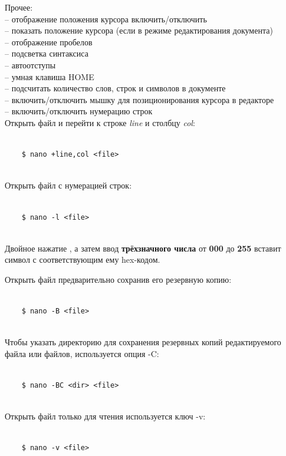 \noindent
{\large{Прочее:}}\\
 -- отображение положения курсора включить/отключить\\
 -- показать положение курсора (если в режиме редактирования документа)\\
 -- отображение пробелов\\
 -- подсветка синтаксиса\\
 -- автоотступы\\
 -- умная клавиша HOME\\
 -- подсчитать количество слов, строк и символов в документе\\
 -- включить/отключить мышку для позиционирования курсора в редакторе\\
 -- включить/отключить нумерацию строк\\

Открыть файл  и перейти к строке \textit{line} и столбцу \textit{col}:
\begin{lstlisting}
	
	$ nano +line,col <file>
	
\end{lstlisting}	

Открыть файл  с нумерацией строк:
\begin{lstlisting}
	
	$ nano -l <file>
	
\end{lstlisting}	

Двойное нажатие , а затем ввод \textbf{трёхзначного числа} от \textbf{000} до \textbf{255} вставит символ с соответствующим ему hex-кодом.

Открыть файл  предварительно сохранив его резервную копию:
\begin{lstlisting}
	
	$ nano -B <file>
	
\end{lstlisting}	

Чтобы указать директорию для сохранения резервных копий редактируемого файла или файлов, используется опция -C:
\begin{lstlisting}
	
	$ nano -BC <dir> <file>
	
\end{lstlisting}	


Открыть файл  только для чтения используется ключ -v:
\begin{lstlisting}
	
	$ nano -v <file>
	
\end{lstlisting}	
